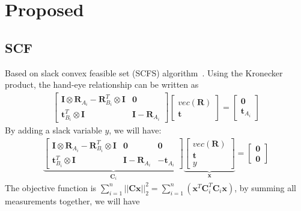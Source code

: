 \documentclass[a4paper]{report}
\begin{document}
\section{Proposed}
\subsection{SCF}
Based on slack convex feasible set (SCFS) algorithm~\cite{liu2017speed}. 
Using the Kronecker product, the hand-eye relationship can be written as
\begin{align}
\left[
\begin{matrix}
\mathbf{I}\otimes \mathbf{R}_{A_i} - \mathbf{R}_{B_i}^T \otimes \mathbf{I} &  \mathbf{0}\\
\mathbf{t}_{B_i}^T\otimes \mathbf{I} & \mathbf{I}-\mathbf{R}_{A_i}
\end{matrix}
\right]
\left[
\begin{matrix}
vec(\mathbf{R}) \\
\mathbf{t}
\end{matrix}
\right]=\left[
\begin{matrix}
\mathbf{0} \\
\mathbf{t}_{A_i}
\end{matrix}
\right]
\end{align}
By adding a slack variable $y$, we will have:
\begin{align}
\underbrace{
\left[
\begin{matrix}
\mathbf{I}\otimes \mathbf{R}_{A_i} - \mathbf{R}_{B_i}^T \otimes \mathbf{I} &  \mathbf{0} & \mathbf{0}\\
\mathbf{t}_{B_i}^T\otimes \mathbf{I} & \mathbf{I}-\mathbf{R}_{A_i} & -\mathbf{t}_{A_i}
\end{matrix}
\right]}_{\mathbf{C}_i}
\underbrace{
\left[
\begin{matrix}
vec(\mathbf{R}) \\
\mathbf{t} \\
y
\end{matrix}
\right]}_{\mathbf{x}}=\left[
\begin{matrix}
\mathbf{0} \\
\mathbf{0}
\end{matrix}
\right]
\end{align}
The objective function is $\sum_{i=1}^{n}||\mathbf{C}\mathbf{x}||_2^2=\sum_{i=1}^{n} \left(\mathbf{x}^T\mathbf{C}_i^T\mathbf{C}_i\mathbf{x}\right)$, by summing all measurements together, we will have
\end{document}
